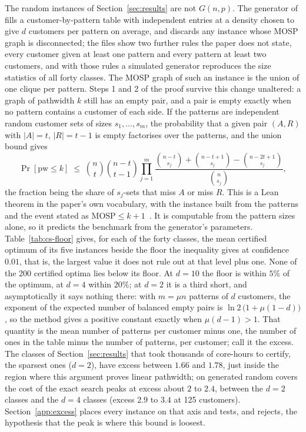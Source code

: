 The random instances of Section~\ref{sec:results} are not $G(n,p)$. The
generator of \citet{ChuStuckey2009} fills a customer-by-pattern table with
independent entries at a density chosen to give $d$ customers per pattern on
average, and discards any instance whose MOSP graph is disconnected; the
files show two further rules the paper does not state, every customer given
at least one pattern and every pattern at least two customers, and with those
rules a simulated generator reproduces the size statistics of all forty
classes. The MOSP graph of such an instance is the union of one clique per
pattern. Steps 1 and 2 of the proof survive this change unaltered: a graph of
pathwidth $k$ still has an empty pair, and a pair is empty exactly when no
pattern contains a customer of each side. If the patterns are independent
random customer sets of sizes $s_1,\dots,s_m$, the probability that a given
pair $(A,R)$ with $|A|=t$, $|R|=t-1$ is empty factorises over the patterns,
and the union bound gives
\[
  \Pr[\mathrm{pw}\le k]\;\le\;\binom nt\binom{n-t}{t-1}\prod_{j=1}^{m}
  \frac{\binom{n-t}{s_j}+\binom{n-t+1}{s_j}-\binom{n-2t+1}{s_j}}{\binom{n}{s_j}},
\]
the fraction being the share of $s_j$-sets that miss $A$ or miss $R$. This is
a Lean theorem in the paper's own vocabulary, with the instance built from the
patterns and the event stated as $\mathrm{MOSP}\le k+1$~.
It is computable from the pattern sizes alone, so it predicts the benchmark
from the generator's parameters. Table~\ref{tab:cs-floor} gives, for each of
the forty classes, the mean certified optimum of its five instances beside
the floor the inequality gives at confidence $0.01$, that is, the largest
value it does not rule out at that level plus one. None of the 200 certified
optima lies below its floor. At $d=10$ the floor is within $5\%$ of the
optimum, at $d=4$ within $20\%$; at $d=2$ it is a third short, and
asymptotically it says nothing there: with $m=\mu n$ patterns of $d$
customers, the exponent of the expected number of balanced empty pairs is
$\ln2\,\bigl(1+\mu(1-d)\bigr)$, so the method gives a positive constant
exactly when $\mu(d-1)>1$. That quantity is the mean number of patterns per
customer minus one, the number of ones in the table minus the number of
patterns, per customer; call it the excess. The classes of
Section~\ref{sec:results} that took thousands of core-hours to certify, the
sparsest ones ($d=2$), have excess between $1.66$ and $1.78$, just inside the
region where this argument proves linear pathwidth; on generated random covers
the cost of the exact search peaks at excess about $2$ to $2.4$, between the
$d=2$ classes and the $d=4$ classes (excess $2.9$ to $3.4$ at 125 customers).
Section~\ref{app:excess} places every instance on that axis and tests, and
rejects, the hypothesis that the peak is where this bound is loosest.

